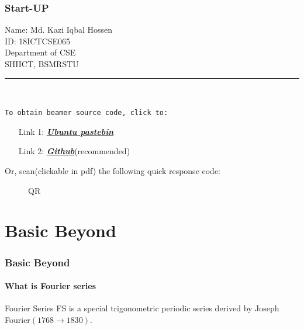 \documentclass[9 pt]{beamer}
\begin{document}
\begin{frame}
	\frametitle{Start-UP}
	\begin{center}
		Name: Md. Kazi Iqbal Hossen\\
		ID: 18ICTCSE065\\
		Department of CSE\\
		SHIICT, BSMRSTU\\
		\textcolor{green}{\rule{11 cm}{3 pt}} \\

		{\footnotesize {}}
	\end{center}
	\vfill
	\texttt{To obtain beamer source code, click to:}
	\begin{itemize}
		\item[Link 1:] \href{https://pastebin.ubuntu.com/p/dY8TWXY24C/}{\textit{\textbf{Ubuntu pastebin}}}
		\item[Link 2:] \href{https://github.com/Sofiullah-Iqbal-Kiron/LaTeX/blob/master/Presentation/Beamer/MAT205\%20Mid/MAT205\%20Mid.tex}{\textit{\textbf{Github}}}{\tiny (recommended)}
	\end{itemize}
	Or, scan{\footnotesize(clickable in pdf)} the following quick response code:
	\begin{figure}
		\caption*{QR} %
		\centering
	\end{figure}
	\transsplitverticalout[duration=2]
\end{frame}


\section{Basic Beyond}


\begin{frame}
	\frametitle{Basic Beyond}
	\framesubtitle{What is Fourier series}
	\begin{block}{Fourier Series}
		FS is a special trigonometric periodic series derived by Joseph Fourier$(1768 \rightarrow 1830)$.
	\end{block}

\end{frame}
\end{document}
